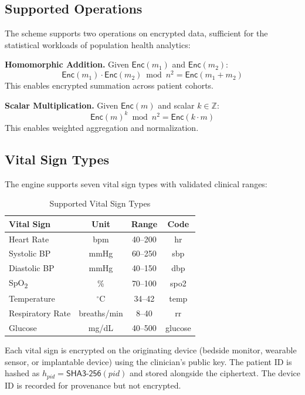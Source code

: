 \documentclass[conference,10pt]{IEEEtran}
\newcommand{\shaiii}{\textsf{SHA3-256}}
\newcommand{\Enc}{\mathsf{Enc}}
\begin{document}
\subsection{Supported Operations}

The scheme supports two operations on encrypted data, sufficient for the statistical workloads of population health analytics:

\textbf{Homomorphic Addition.} Given $\Enc(m_1)$ and $\Enc(m_2)$:
\begin{equation}
\Enc(m_1) \cdot \Enc(m_2) \bmod n^2 = \Enc(m_1 + m_2)
\end{equation}
This enables encrypted summation across patient cohorts.

\textbf{Scalar Multiplication.} Given $\Enc(m)$ and scalar $k \in \mathbb{Z}$:
\begin{equation}
\Enc(m)^k \bmod n^2 = \Enc(k \cdot m)
\end{equation}
This enables weighted aggregation and normalization.

\subsection{Vital Sign Types}

The engine supports seven vital sign types with validated clinical ranges:

\begin{table}[htbp]
\centering
\caption{Supported Vital Sign Types}
\label{tab:vitals}
\begin{tabular}{@{}lccc@{}}
\toprule
\textbf{Vital Sign} & \textbf{Unit} & \textbf{Range} & \textbf{Code} \\
\midrule
Heart Rate & bpm & 40--200 & hr \\
Systolic BP & mmHg & 60--250 & sbp \\
Diastolic BP & mmHg & 40--150 & dbp \\
SpO\textsubscript{2} & \% & 70--100 & spo2 \\
Temperature & $^\circ$C & 34--42 & temp \\
Respiratory Rate & breaths/min & 8--40 & rr \\
Glucose & mg/dL & 40--500 & glucose \\
\bottomrule
\end{tabular}
\end{table}

Each vital sign is encrypted on the originating device (bedside monitor, wearable sensor, or implantable device) using the clinician's public key. The patient ID is hashed as $h_{\mathit{pid}} = \shaiii{}(\mathit{pid})$ and stored alongside the ciphertext. The device ID is recorded for provenance but not encrypted.
\end{document}
